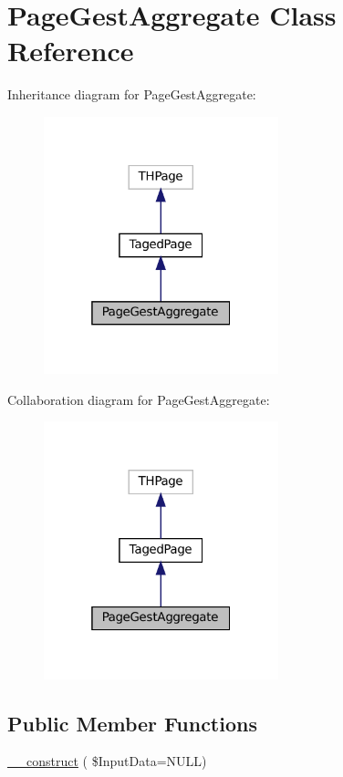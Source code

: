 \hypertarget{class_page_gest_aggregate}{}\section{Page\+Gest\+Aggregate Class Reference}
\label{class_page_gest_aggregate}


Inheritance diagram for Page\+Gest\+Aggregate\+:\nopagebreak
\begin{figure}[H]
\begin{center}
\leavevmode
\includegraphics[width=193pt]{class_page_gest_aggregate__inherit__graph}
\end{center}
\end{figure}


Collaboration diagram for Page\+Gest\+Aggregate\+:\nopagebreak
\begin{figure}[H]
\begin{center}
\leavevmode
\includegraphics[width=193pt]{class_page_gest_aggregate__coll__graph}
\end{center}
\end{figure}
\subsection*{Public Member Functions}
\begin{DoxyCompactItemize}
\item 
\hyperlink{class_page_gest_aggregate_ac15507e70d0de1f85e2130d04a9dc331}{\+\_\+\+\_\+construct} ( \$Input\+Data=N\+U\+LL)
\end{DoxyCompactItemize}
